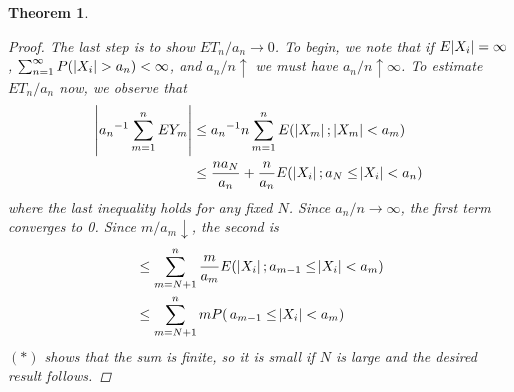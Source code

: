 \documentclass[a4paper,10pt]{article}
\newtheorem{theorem}{Theorem}
\begin{document}
\begin{theorem}
\begin{proof}
\indent The last step is to show $ET_n/a_n \rightarrow 0$. To begin, we note that if $E \abs{X_i}=\infty$,
$\sum_{n=1}^{\infty}{P(\,\abs{X_i}>a_n)}<\infty$, and $a_n/n \uparrow$ we must have $a_n/n \uparrow \infty$.
To estimate $ET_n/a_n$ now, we observe that
\begin{equation*}
\begin{split}
\abs{{a_n}^{-1}\sum_{m=1}^{n}{EY_m}}&\leq {a_n}^{-1}n\sum_{m=1}^{n}{E(\,\abs{X_m};\,\abs{X_m}<a_m)}\\
&\leq \frac{na_N}{a_n}+\frac{n}{a_n}E(\,\abs{X_i};a_N\leq\abs{X_i}<a_n)
\end{split}
\end{equation*}
where the last inequality holds for any fixed $N$. Since $a_n/n \rightarrow \infty$, the
first term converges to 0. Since $m/a_m \downarrow$, the second is
\begin{equation*}
\begin{split}
&\leq \sum_{m=N+1}^{n}{\frac{m}{a_m}E(\,\abs{X_i};a_{m-1}\leq\abs{X_i}<a_m)}\\
&\leq \sum_{m=N+1}^{n}{mP(\,a_{m-1}\leq\abs{X_i}<a_m)}
\end{split}
\end{equation*}
$(\ast)$ shows that the sum is finite, so it is small if $N$ is large and the desired
result follows.
\end{proof}
\end{theorem}
\end{document}
